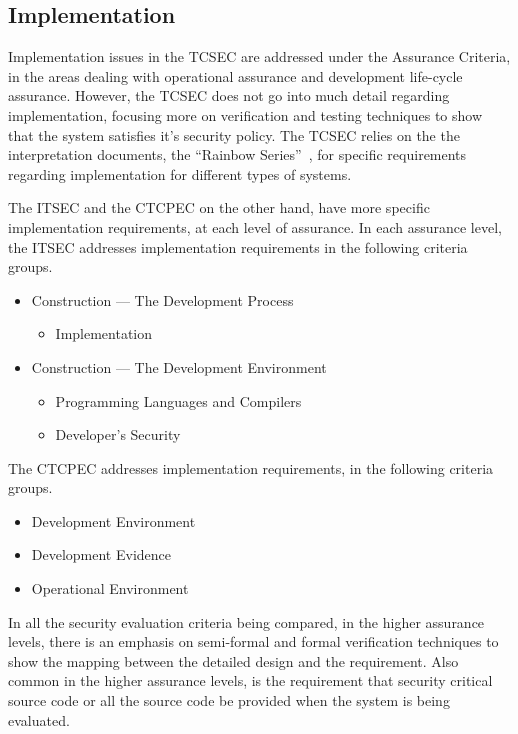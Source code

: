     \subsection{Implementation} 
    Implementation issues in the TCSEC are addressed under the Assurance Criteria, in the areas dealing
    with operational assurance and development life-cycle assurance. However, the TCSEC does not 
    go into much detail regarding implementation, focusing more on verification and testing techniques
    to show that the system satisfies it's security policy. The TCSEC relies on the the interpretation
    documents, the ``Rainbow Series''~\cite{rainbow}, for specific requirements regarding implementation
    for different types of systems.

    The ITSEC and the CTCPEC on the other hand, have more specific implementation requirements, at each
    level of assurance. In each assurance level, the ITSEC addresses implementation requirements in the
    following criteria groups.
    \begin{itemize}
        \item Construction --- The Development Process
            \begin{itemize}
                \item Implementation
            \end{itemize}
        \item Construction --- The Development Environment
            \begin{itemize}
                \item Programming Languages and Compilers
                \item Developer's Security
            \end{itemize}
    \end{itemize}
    The CTCPEC addresses implementation requirements, in the following criteria groups.
    \begin{itemize}
        \item Development Environment
        \item Development Evidence
        \item Operational Environment
    \end{itemize}
    In all the security evaluation criteria being compared, in the higher assurance levels,
    there is an emphasis on semi-formal and formal verification techniques to show the mapping
    between the detailed design and the requirement. Also common in the higher assurance levels,
    is the requirement that security critical source code or all the source code be provided
    when the system is being evaluated.

